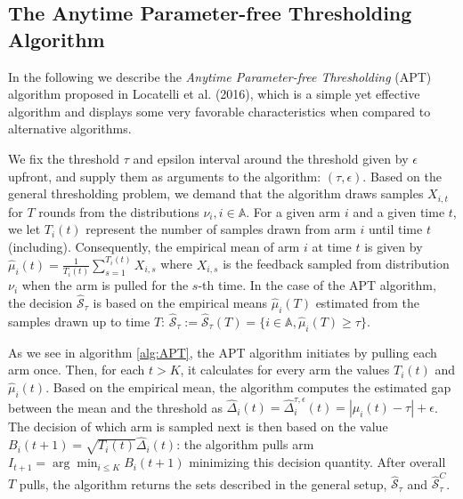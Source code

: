 \documentclass[11pt,]{article}
\begin{document}
\subsection{\texorpdfstring{The Anytime Parameter-free Thresholding
Algorithm
\label{sec:TheAPTAlgorithm}}{The Anytime Parameter-free Thresholding Algorithm }}\label{the-anytime-parameter-free-thresholding-algorithm}

In the following we describe the \emph{Anytime Parameter-free
Thresholding} (APT) algorithm proposed in Locatelli et al. (2016), which
is a simple yet effective algorithm and displays some very favorable
characteristics when compared to alternative algorithms.

We fix the threshold \(\tau\) and epsilon interval around the threshold
given by \(\epsilon\) upfront, and supply them as arguments to the
algorithm: \((\tau, \epsilon)\). Based on the general thresholding
problem, we demand that the algorithm draws samples \(X_{i,t}\) for
\(T\) rounds from the distributions \(\nu_i, i\in \mathbb{A}\). For a
given arm \(i\) and a given time \(t\), we let \(T_i(t)\) represent the
number of samples drawn from arm \(i\) until time \(t\) (including).
Consequently, the empirical mean of arm \(i\) at time \(t\) is given by
\(\hat{\mu}_i(t) = \frac{1}{T_i(t)} \sum_{s=1}^{T_i(t)} X_{i,s}\) where
\(X_{i,s}\) is the feedback sampled from distribution \(\nu_i\) when the
arm is pulled for the \(s\)-th time. In the case of the APT algorithm,
the decision \(\hat{\mathcal{S}}_{\tau}\) is based on the empirical
means \(\hat{\mu}_i(T)\) estimated from the samples drawn up to time
\(T\):
\(\hat{\mathcal{S}}_{\tau} := \hat{\mathcal{S}}_{\tau}(T) = \{i \in \mathbb{A}, \hat{\mu}_i(T) \geq \tau\}\).

As we see in algorithm \ref{alg:APT}, the APT algorithm initiates by
pulling each arm once. Then, for each \(t > K\), it calculates for every
arm the values \(T_i(t)\) and \(\hat{\mu}_i(t)\). Based on the empirical
mean, the algorithm computes the estimated gap between the mean and the
threshold as
\(\hat{\Delta}_i(t) = \hat{\Delta}_i^{\tau, \epsilon}(t) = |\mu_i(t) - \tau| + \epsilon\).
The decision of which arm is sampled next is then based on the value
\(B_i(t+1) = \sqrt{T_i(t)} \hat{\Delta}_i(t)\): the algorithm pulls arm
\(I_{t+1} = \arg \min_{i\leq K} B_i(t+1)\) minimizing this decision
quantity. After overall \(T\) pulls, the algorithm returns the sets
described in the general setup, \(\hat{\mathcal{S}}_{\tau}\) and
\(\hat{\mathcal{S}}^C_{\tau}\).

\IncMargin{1em}
\end{document}

